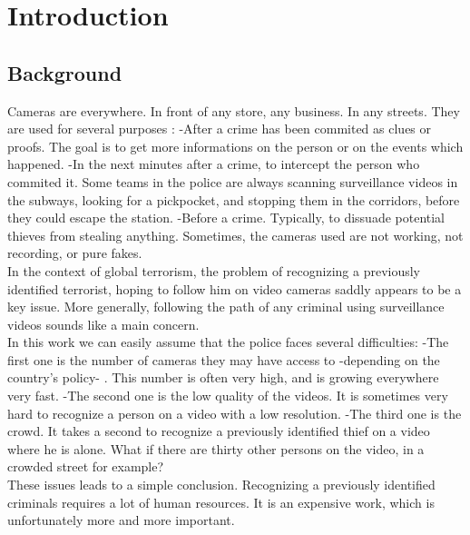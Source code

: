 \setlength{\footskip}{8mm}
\chapter{Introduction}

\section{Background}


Cameras are everywhere. In front of any store, any business. In any streets. They are used for several purposes :\newline
-After a crime has been commited as clues or proofs. The goal is to get more informations on the person or on the events which happened.\newline
-In the next minutes after a crime, to intercept the person who commited it. Some teams in the police are always scanning surveillance videos in the subways, looking for a pickpocket, and stopping them in the corridors, before they could escape the station.\newline
-Before a crime. Typically, to dissuade potential thieves from stealing anything. Sometimes, the cameras used are not working, not recording, or pure fakes.\\

In the context of global terrorism, the problem of recognizing a previously identified terrorist, hoping to follow him on video cameras saddly appears to be a key issue. More generally, following the path of any criminal using surveillance videos sounds like a main concern.\\

In this work we can easily assume that the police faces several difficulties:\newline
-The first one is the number of cameras they may have access to -depending on the country's policy- . This number is often very high, and is growing everywhere very fast.\newline
-The second one is the low quality of the videos. It is sometimes very hard to recognize a person on a video with a low resolution.\newline
-The third one is the crowd. It takes a second to recognize a previously identified thief on a video where he is alone. What if there are thirty other persons on the video, in a crowded street for example? \\

These issues leads to a simple conclusion. Recognizing a previously identified criminals requires a lot of human resources. It is an expensive work, which is unfortunately more and more important.\\

